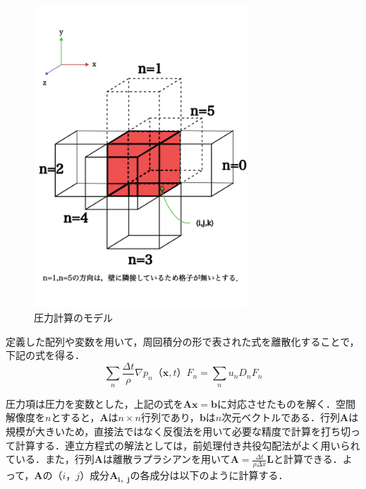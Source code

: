 \documentclass[a4j,12pt]{jreport}
\begin{document}
\begin{figure}[H]
\begin{center}
\includegraphics[width=80mm]{images/pressure_model.png}
\caption{圧力計算のモデル}
\label{fig:pressure_model}
\end{center}
\end{figure}
定義した配列や変数を用いて，周回積分の形で表された式を離散化することで，下記の式を得る．
\[
	\sum_{n}\frac{\varDelta t}{\rho}\nabla p_n （\bm{x},t） F_n =  \sum_{n}u_nD_nF_n
\]



圧力項は圧力を変数とした，上記の式を$\bm{Ax=b}$に対応させたものを解く．空間解像度を$n$とすると，$\bm{A}$は$n \times n$行列であり，$\bm{b}$は$n$次元ベクトルである．行列$\bm{A}$は規模が大きいため，直接法ではなく反復法を用いて必要な精度で計算を打ち切って計算する．連立方程式の解法としては，前処理付き共役勾配法がよく用いられている．また，行列$\mathbf{A}$は離散ラプラシアンを用いて$\mathbf{A} = \frac{\varDelta t}{\rho \varDelta x}\mathbf{L}$と計算できる．よって，$\mathbf{A}$の$（i，j）$成分$\mathbf{A_{i，j}}$の各成分は以下のように計算する．
\end{document}
